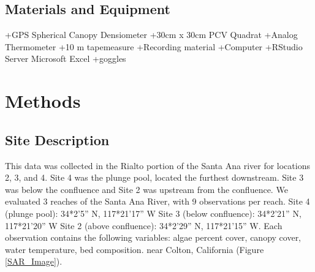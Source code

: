\documentclass{article}
\begin{document}
\subsection{Materials and Equipment} 
+GPS Spherical Canopy Densiometer +30cm x 30cm PCV Quadrat +Analog Thermometer +10 m tapemeasure +Recording material +Computer +RStudio Server Microsoft Excel +goggles 



\section{Methods}


\subsection{Site Description}

This data was collected in the Rialto portion of the Santa Ana river for locations 2, 3, and 4. Site 4 was the plunge pool, located the furthest downstream. Site 3 was below the confluence and Site 2 was upstream from the confluence. 
We evaluated 3 reaches of the Santa Ana River, with 9 observations per reach. Site 4 (plunge pool): 34*2’5” N, 117*21’17” W Site 3 (below conﬂuence): 34*2’21” N, 117*21’20” W Site 2 (above conﬂuence): 34*2’29” N, 117*21’15” W. Each observation contains the following variables: algae percent cover, canopy cover, water temperature, bed composition. near Colton, California (Figure \ref{SAR_Image}). 
\end{document}
